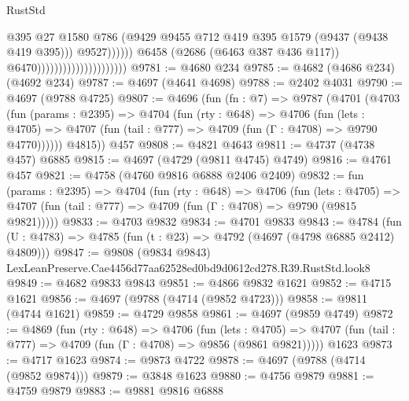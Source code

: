 \begin{lexlean}{RustStd}
\begin{coremodule}
                                                          @395
                                                          @27
                                                          @1580
                                                          @786
                                                          (@9429
                                                            @9455
                                                            @712
                                                            @419
                                                            @395
                                                            @1579
                                                            (@9437 (@9438 @419 @395)))
                                                          @9527))))))
                                              @6458
                                              (@2686 (@6463 @387 @436 @117))
                                              @6470)))))))))))))))))))))
@9781 := @4680 @234
@9785 := @4682 (@4686 @234) (@4692 @234)
@9787 := @4697 (@4641 @4698)
@9788 := @2402 @4031
@9790 := @4697 (@9788 @4725)
@9807 := @4696
    (fun (fn : @7) =>
    @9787
      (@4701
        (@4703
          (fun (params : @2395) =>
          @4704
            (fun (rty : @648) =>
            @4706
              (fun (lets : @4705) =>
              @4707 (fun (tail : @777) => @4709 (fun (Γ : @4708) => @9790 @4770))))))
        @4815))
    @457
@9808 := @4821 @4643
@9811 := @4737 (@4738 @457) @6885
@9815 := @4697 (@4729 (@9811 @4745) @4749)
@9816 := @4761 @457
@9821 := @4758 (@4760 @9816 @6888 @2406 @2409)
@9832 := fun (params : @2395) =>
  @4704
    (fun (rty : @648) =>
    @4706
      (fun (lets : @4705) =>
      @4707 (fun (tail : @777) => @4709 (fun (Γ : @4708) => @9790 (@9815 @9821)))))
@9833 := @4703 @9832
@9834 := @4701 @9833
@9843 := @4784 (fun (U : @4783) => @4785 (fun (t : @23) => @4792 (@4697 (@4798 @6885 @2412) @4809)))
@9847 := @9808 (@9834 @9843) LexLeanPreserve.Cae4456d77aa62528ed0bd9d0612cd278.R39.RustStd.look8
@9849 := @4682 @9833 @9843
@9851 := @4866 @9832 @1621
@9852 := @4715 @1621
@9856 := @4697 (@9788 (@4714 (@9852 @4723)))
@9858 := @9811 (@4744 @1621)
@9859 := @4729 @9858
@9861 := @4697 (@9859 @4749)
@9872 := @4869
    (fun (rty : @648) =>
    @4706
      (fun (lets : @4705) =>
      @4707 (fun (tail : @777) => @4709 (fun (Γ : @4708) => @9856 (@9861 @9821)))))
    @1623
@9873 := @4717 @1623
@9874 := @9873 @4722
@9878 := @4697 (@9788 (@4714 (@9852 @9874)))
@9879 := @3848 @1623
@9880 := @4756 @9879
@9881 := @4759 @9879
@9883 := @9881 @9816 @6888

\end{coremodule}
\end{lexlean}
